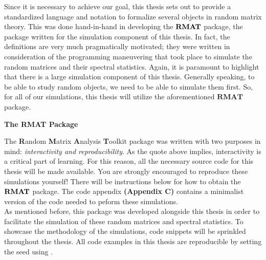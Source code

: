Since it is necessary to achieve our goal, this thesis sets out to provide a standardized language and notation to formalize several objects in random matrix theory.
This was done hand-in-hand in developing the ${\textbf{RMAT}}$ package, the package written for the simulation component of this thesis.
In fact, the definitions are very much pragmatically motivated;
they were written in consideration of the programming maneuvering that took place to simulate the random matrices and their spectral statistics.
Again, it is paramount to highlight that there is a large simulation component of this thesis. Generally speaking, to be able to study random objects, we need to be able to simulate them first.
So, for all of our simulations, this thesis will utilize the aforementioned $\textbf{RMAT}$ package.

\newpage
%

\vspace*{0.1em}
{\Large \textbf{The RMAT Package}\par}

The \textbf{R}andom \textbf{M}atrix \textbf{A}nalysis \textbf{T}oolkit package was written with two purposes in mind: \textit{interactivity and reproducibility}.
As the quote above implies, interactivity is a critical part of learning.
For this reason, all the necessary source code for this thesis will be made available. You are strongly encouraged to reproduce these simulations yourself!
There will be instructions below for how to obtain the ${\textbf{RMAT}}$ package. The code appendix \textbf{(Appendix C)} contains a minimalist version of the code
needed to peform these simulations.\\

As mentioned before, this package was developed alongside this thesis in order to facilitate the simulation of these random matrices and spectral statistics.
To showcase the methodology of the simulations, code snippets will be sprinkled throughout the thesis. All code examples in this thesis are reproducible by setting
the seed using . \\

